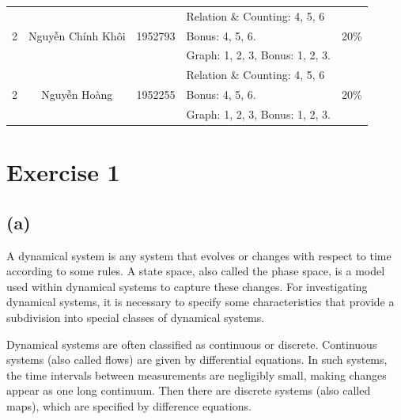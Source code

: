 \documentclass[a4paper]{article}
\begin{document}
\begin{center}
\begin{tabular}{|c|c|c|l|c|}
    \hline
    \multirow{3}{*}{2} & \multirow{3}{*}{Nguyễn Chính Khôi}     & \multirow{3}{*}{1952793} & \textendash{} Relation \& Counting: 4, 5, 6   & \multirow{3}{*}{20\%}       \\
                       &                                        &                          & Bonus: 4, 5, 6.                               &                             \\
                       &                                        &                          & \textendash{} Graph: 1, 2, 3, Bonus: 1, 2, 3. &                             \\
    \hline
    \multirow{3}{*}{2} & \multirow{3}{*}{Nguyễn Hoàng}          & \multirow{3}{*}{1952255} & \textendash{} Relation \& Counting: 4, 5, 6   & \multirow{3}{*}{20\%}       \\
                       &                                        &                          & Bonus: 4, 5, 6.                               &                             \\
                       &                                        &                          & \textendash{} Graph: 1, 2, 3, Bonus: 1, 2, 3. &                             \\
    \hline
  \end{tabular}
\end{center}


\section{Exercise 1}
\subsection{(a)}
A dynamical system is any system that evolves or changes with respect to time according to some rules.
A state space, also called the phase space, is a model used within dynamical systems to capture these changes.
For investigating dynamical systems, it is necessary to specify some characteristics that provide a subdivision into special classes of dynamical systems.

Dynamical systems are often classified as continuous or discrete.
Continuous systems (also called flows) are given by differential equations.
In such systems, the time intervals between measurements are negligibly small, making changes appear as one long continuum.
Then there are discrete systems (also called maps), which are specified by difference equations.
\end{document}
